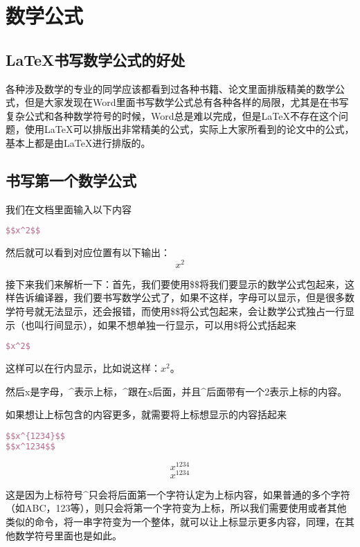 \chapter{数学公式}
\section{\LaTeX{}书写数学公式的好处}
各种涉及数学的专业的同学应该都看到过各种书籍、论文里面排版精美的数学公式，但是大家发现在Word里面书写数学公式总有各种各样的局限，尤其是在书写复杂公式和各种数学符号的时候，Word总是难以完成，但是LaTeX不存在这个问题，使用LaTeX可以排版出非常精美的公式，实际上大家所看到的论文中的公式，基本上都是由LaTeX进行排版的。
\section{书写第一个数学公式}
我们在文档里面输入以下内容
\begin{lstlisting}[language=TeX]
$$x^2$$
\end{lstlisting}

然后就可以看到对应位置有以下输出：
$$x^2$$

接下来我们来解析一下：首先，我们要使用\$\$将我们要显示的数学公式包起来，这样告诉编译器，我们要书写数学公式了，如果不这样，字母可以显示，但是很多数学符号就无法显示，还会报错，而使用\$\$将公式包起来，会让数学公式独占一行显示（也叫行间显示），如果不想单独一行显示，可以用\$将公式括起来
\begin{lstlisting}[language=TeX]
$x^2$
\end{lstlisting}

这样可以在行内显示，比如说这样：$x^2$。

然后x是字母，\^{}表示上标，\^{}跟在x后面，并且\^{}后面带有一个2表示上标的内容。

如果想让上标包含的内容更多，就需要将上标想显示的内容括起来
\begin{lstlisting}[language=TeX]
$$x^{1234}$$
$$x^1234$$
\end{lstlisting}
$$x^{1234}$$
$$x^1234$$

这是因为上标符号\^{}只会将后面第一个字符认定为上标内容，如果普通的多个字符（如ABC，123等），则只会将第一个字符变为上标，所以我们需要使用{}或者其他类似的命令，将一串字符变为一个整体，就可以让上标显示更多内容，同理，在其他数学符号里面也是如此。


